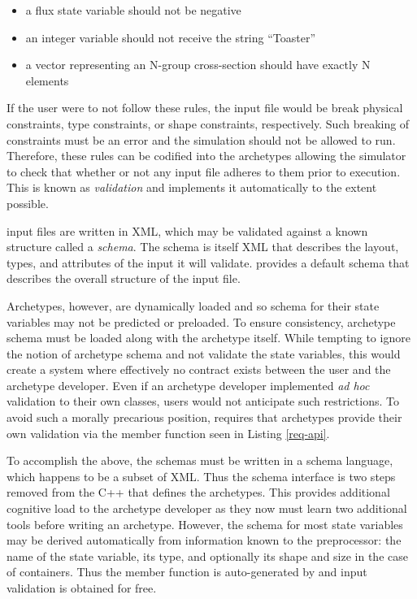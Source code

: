 \begin{itemize} 
    \item a flux state variable should not be negative
    \item an integer variable should not receive the string ``Toaster''
    \item a vector representing an N-group cross-section should have exactly N 
          elements
\end{itemize} 
If the user were to not follow these rules, the input file would be break physical
constraints, type constraints, or shape constraints, respectively. 
Such breaking of constraints must be an error and the simulation should not be 
allowed to run. 
Therefore, these rules can be codified into the archetypes allowing 
the simulator to check that whether or not any input file adheres to them prior
to execution. This is known as \emph{validation} and \cyclus implements it 
automatically to the extent possible. 

\Cyclus input files are written in \gls{XML}, which  may be validated against a 
known structure called a \emph{schema}. The schema is itself \gls{XML} that describes 
the layout, types, and attributes of the input it will validate.
\Cyclus provides a default schema that describes the overall structure of the 
input file.

Archetypes, however, are dynamically loaded and so schema for their state 
variables may not be predicted or preloaded. To ensure consistency, archetype schema 
must be loaded along with the archetype itself.  While tempting to ignore the 
notion of archetype schema and not validate the state variables, this would
create a system where effectively no contract exists between the 
user and the archetype developer. Even if an archetype developer implemented 
\emph{ad hoc} validation to their own classes, users would not
anticipate such 
restrictions.  To avoid such a morally precarious position, \cyclus requires
that archetypes provide their own validation via the  member 
function seen in Listing \ref{req-api}.

To accomplish the
above, the schemas must be written in a schema language, which happens to be a 
subset of \gls{XML}. Thus the schema interface is two steps removed from the C++ that 
defines the archetypes. 
This provides additional 
cognitive load to the archetype developer as they now must learn two additional
tools before writing an archetype. However, the schema for most state
variables may be derived automatically from information known to the preprocessor:
the name of the state variable, its type, and optionally its shape and size in 
the case of containers. Thus the  member function is auto-generated
by \cycpp and input validation is obtained for free. 

